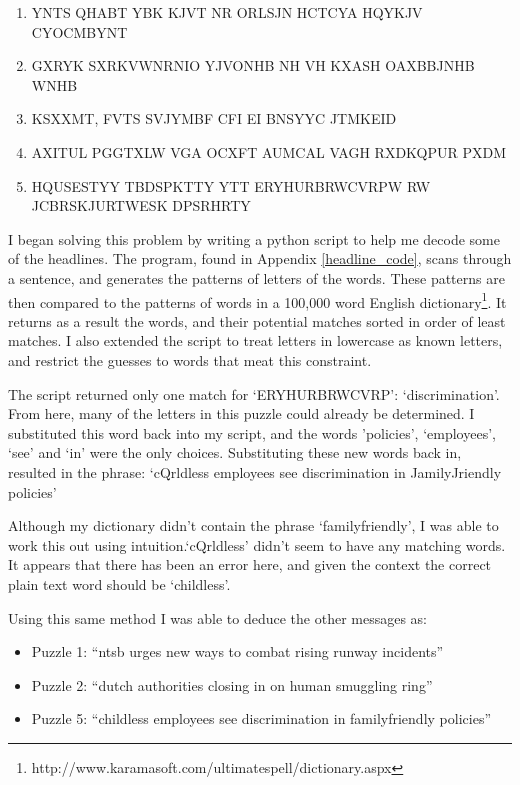 \documentclass[11pt,a4paper,twoside]{article}
\begin{document}
\begin{enumerate}[noitemsep]
\item YNTS QHABT YBK KJVT NR ORLSJN HCTCYA HQYKJV CYOCMBYNT 
\item GXRYK SXRKVWNRNIO YJVONHB NH VH KXASH OAXBBJNHB WNHB 
\item KSXXMT, FVTS SVJYMBF CFI EI BNSYYC JTMKEID 
\item AXITUL PGGTXLW VGA OCXFT AUMCAL VAGH RXDKQPUR PXDM
\item HQUSESTYY TBDSPKTTY YTT ERYHURBRWCVRPW RW JCBRSKJURTWESK DPSRHRTY
\end{enumerate}

I began solving this problem by writing a python script to help me decode some
of the headlines. The program, found in Appendix \ref{headline_code}, scans
through a sentence, and generates the patterns of letters of the words. These
patterns are then compared to the patterns of words in a 100,000 word English
dictionary\footnote{http://www.karamasoft.com/ultimatespell/dictionary.aspx}.
It returns as a result the words, and their potential matches sorted in order
of least matches. I also extended the script to treat letters in lowercase as
known letters, and restrict the guesses to words that meat this constraint.  

The script returned only one match for `ERYHURBRWCVRP': `discrimination'.  From
here, many of the letters in this puzzle could already be determined. I
substituted this word back into my script, and the words 'policies',
`employees', `see' and `in' were the only choices. Substituting these new words
back in, resulted in the phrase: `cQrldless employees see discrimination in
JamilyJriendly policies'

Although my dictionary didn't contain the phrase `familyfriendly', I was able
to work this out using intuition.`cQrldless' didn't seem to have any matching
words. It appears that there has been an error here, and given the context the
correct plain text word should be `childless'. 

Using this same method I was able to deduce the other messages as:
\begin{itemize}[noitemsep]
\item Puzzle 1: ``ntsb urges new ways to combat rising runway incidents''
\item Puzzle 2: ``dutch authorities closing in on human smuggling ring''
\item Puzzle 5: ``childless employees see discrimination in familyfriendly policies''
\end{itemize}
\end{document}
